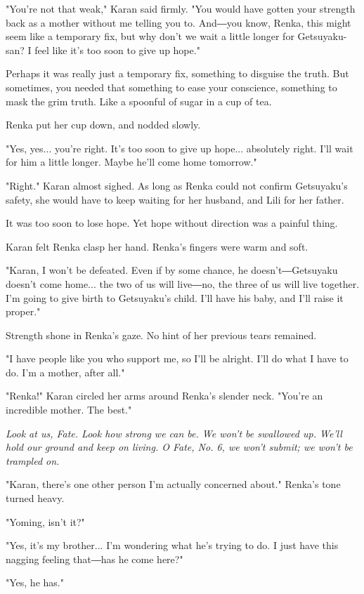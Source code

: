 "You're not that weak," Karan said firmly. "You would have gotten your
strength back as a mother without me telling you to. And―you know,
Renka, this might seem like a temporary fix, but why don't we wait a
little longer for Getsuyaku-san? I feel like it's too soon to give up
hope."

Perhaps it was really just a temporary fix, something to disguise the
truth. But sometimes, you needed that something to ease your conscience,
something to mask the grim truth. Like a spoonful of sugar in a cup of
tea.

Renka put her cup down, and nodded slowly.

"Yes, yes... you're right. It's too soon to give up hope... absolutely
right. I'll wait for him a little longer. Maybe he'll come home
tomorrow."

"Right." Karan almost sighed. As long as Renka could not confirm
Getsuyaku's safety, she would have to keep waiting for her husband, and
Lili for her father.

It was too soon to lose hope. Yet hope without direction was a painful
thing.

Karan felt Renka clasp her hand. Renka's fingers were warm and soft.

"Karan, I won't be defeated. Even if by some chance, he
doesn't―Getsuyaku doesn't come home... the two of us will live―no, the
three of us will live together. I'm going to give birth to Getsuyaku's
child. I'll have his baby, and I'll raise it proper."

Strength shone in Renka's gaze. No hint of her previous tears remained.

"I have people like you who support me, so I'll be alright. I'll do what
I have to do. I'm a mother, after all."

"Renka!" Karan circled her arms around Renka's slender neck. "You're an
incredible mother. The best."

\emph{Look at us, Fate. Look how strong we can be. We won't be swallowed up.
We'll hold our ground and keep on living. O Fate, No. 6, we won't
submit; we won't be trampled on.}

"Karan, there's one other person I'm actually concerned about." Renka's
tone turned heavy.

"Yoming, isn't it?"

"Yes, it's my brother... I'm wondering what he's trying to do. I just
have this nagging feeling that―has he come here?"

"Yes, he has."

